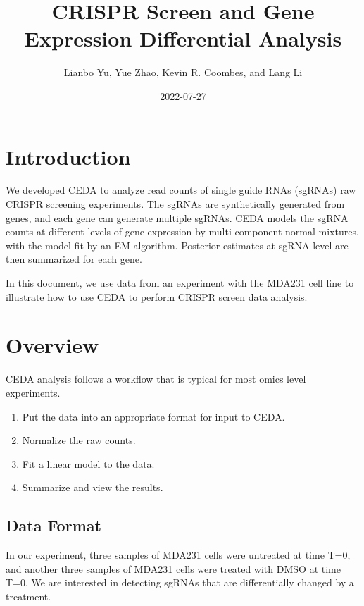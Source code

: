 \documentclass[
]{article}
\title{CRISPR Screen and Gene Expression Differential Analysis}
\author{Lianbo Yu, Yue Zhao, Kevin R. Coombes, and Lang Li}
\date{2022-07-27}
\providecommand{\tightlist}{%
  \setlength{\itemsep}{0pt}\setlength{\parskip}{0pt}}
\begin{document}
\maketitle

{
\setcounter{tocdepth}{2}
\tableofcontents
}
\hypertarget{introduction}{%
\section{Introduction}\label{introduction}}

We developed CEDA to analyze read counts of single guide RNAs (sgRNAs)
raw CRISPR screening experiments. The sgRNAs are synthetically generated
from genes, and each gene can generate multiple sgRNAs. CEDA models the
sgRNA counts at different levels of gene expression by multi-component
normal mixtures, with the model fit by an EM algorithm. Posterior
estimates at sgRNA level are then summarized for each gene.

In this document, we use data from an experiment with the MDA231 cell
line to illustrate how to use CEDA to perform CRISPR screen data
analysis.

\hypertarget{overview}{%
\section{Overview}\label{overview}}

CEDA analysis follows a workflow that is typical for most omics level
experiments.

\begin{enumerate}
\def\labelenumi{\arabic{enumi}.}
\tightlist
\item
  Put the data into an appropriate format for input to CEDA.
\item
  Normalize the raw counts.
\item
  Fit a linear model to the data.
\item
  Summarize and view the results.
\end{enumerate}

\hypertarget{data-format}{%
\subsection{Data Format}\label{data-format}}

In our experiment, three samples of MDA231 cells were untreated at time
T=0, and another three samples of MDA231 cells were treated with DMSO at
time T=0. We are interested in detecting sgRNAs that are differentially
changed by a treatment.
\end{document}
